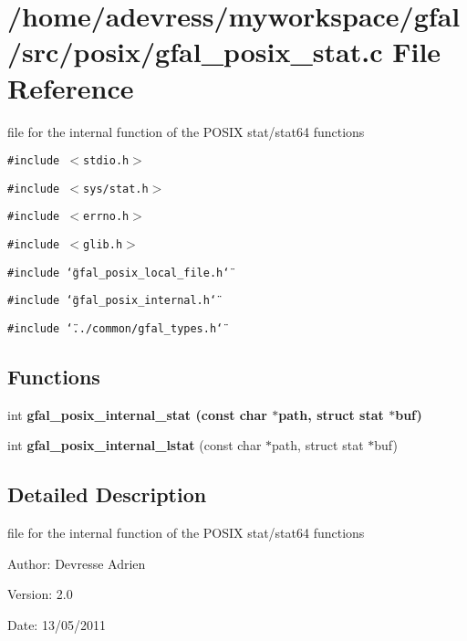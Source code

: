 \section{/home/adevress/myworkspace/gfal/src/posix/gfal\_\-posix\_\-stat.c File Reference}
\label{gfal__posix__stat_8c}
file for the internal function of the POSIX stat/stat64 functions 

{\tt \#include $<$stdio.h$>$}\par
{\tt \#include $<$sys/stat.h$>$}\par
{\tt \#include $<$errno.h$>$}\par
{\tt \#include $<$glib.h$>$}\par
{\tt \#include \char`\"{}gfal\_\-posix\_\-local\_\-file.h\char`\"{}}\par
{\tt \#include \char`\"{}gfal\_\-posix\_\-internal.h\char`\"{}}\par
{\tt \#include \char`\"{}../common/gfal\_\-types.h\char`\"{}}\par
\subsection*{Functions}
\begin{CompactItemize}
\item 
int \bf{gfal\_\-posix\_\-internal\_\-stat} (const char $\ast$path, struct stat $\ast$buf)
\item 
int \textbf{gfal\_\-posix\_\-internal\_\-lstat} (const char $\ast$path, struct stat $\ast$buf)\label{gfal__posix__stat_8c_ec4c6fc5e973e8fdb29bbff0a0fb096d}

\end{CompactItemize}


\subsection{Detailed Description}
file for the internal function of the POSIX stat/stat64 functions 

\begin{Desc}
\item[Author:]Devresse Adrien \end{Desc}
\begin{Desc}
\item[Version:]2.0 \end{Desc}
\begin{Desc}
\item[Date:]13/05/2011 \end{Desc}



